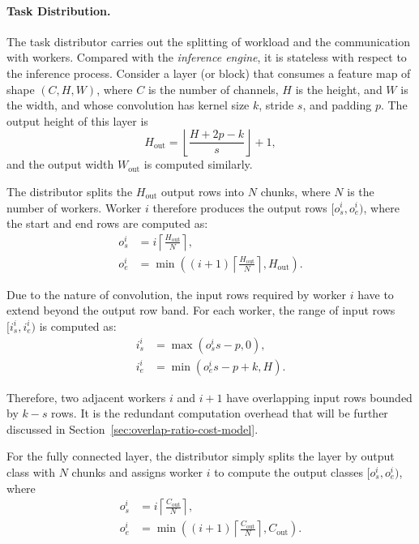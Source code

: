 \paragraph{Task Distribution.} 
The task distributor carries out the splitting of workload and the communication with workers. Compared with the \emph{inference engine}, it is stateless with respect to the inference process. Consider a layer (or block) that consumes a feature map of shape $(C,H,W)$, where $C$ is the number of channels, $H$ is the height, and $W$ is the width, and whose convolution has kernel size $k$, stride $s$, and padding $p$. The output height of this layer is
\begin{equation}
    H_{\mathrm{out}} = \left\lfloor \frac{H + 2p - k}{s} \right\rfloor + 1,
\end{equation}
and the output width $W_{\mathrm{out}}$ is computed similarly. 

The distributor splits the $H_{\mathrm{out}}$ output rows into $N$ chunks, where $N$ is the number of workers. Worker $i$ therefore produces the output rows $[o_s^i, o_e^i)$, where the start and end rows are computed as:
\begin{align}
    o_s^i &= i\left\lceil \frac{ H_{\mathrm{out}}}{N} \right\rceil, \\
    o_e^i &= \min\left((i+1)\left\lceil \frac{ H_{\mathrm{out}}}{N} \right\rceil, H_{\mathrm{out}}\right).
\end{align}

Due to the nature of convolution, the input rows required by worker $i$ have to extend beyond the output row band. For each worker, the range of input rows $[i_s^i, i_e^i)$ is computed as:
\begin{align}
    i_s^i &= \max\left(o_s^i s - p, 0\right), \\
    i_e^i &= \min\left(o_e^i s - p + k, H\right).
\end{align}  

Therefore, two adjacent workers $i$ and $i+1$ have overlapping input rows bounded by $k-s$ rows. It is the redundant computation overhead that will be further discussed in Section~\ref{sec:overlap-ratio-cost-model}. 

For the fully connected layer, the distributor simply splits the layer by output class with $N$ chunks and assigns worker $i$ to compute the output classes $[o_s^i, o_e^i)$, where
\begin{align}
    o_s^i &= i\left\lceil \frac{ C_{\mathrm{out}}}{N} \right\rceil, \\
    o_e^i &= \min\left((i+1)\left\lceil \frac{ C_{\mathrm{out}}}{N} \right\rceil, C_{\mathrm{out}}\right).
\end{align}




